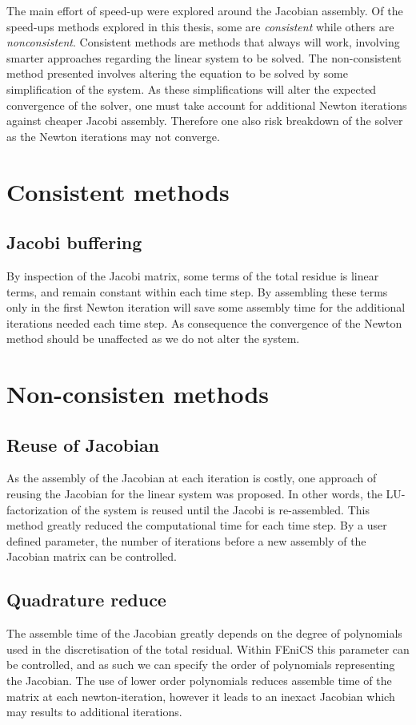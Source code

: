 The main effort of speed-up were explored around the Jacobian assembly.
Of the speed-ups methods explored in this thesis, some are \textit{consistent} while others are \textit{nonconsistent}. Consistent methods are methods that always will work, involving smarter approaches regarding the linear system to be solved. The non-consistent method presented involves altering the equation to be solved by some simplification of the system. As these simplifications will alter the expected convergence of the solver, one must take account for additional Newton iterations against cheaper Jacobi assembly. Therefore one also risk breakdown of the solver as the Newton iterations may not converge.   


\section{Consistent methods}
\subsection{Jacobi buffering}
By inspection of the Jacobi matrix, some terms of the total residue is linear terms, and remain constant within each time step. By assembling these terms only in the first Newton iteration will save some assembly time for the additional iterations needed each time step. As consequence the convergence of the Newton method should be unaffected as we do not alter the system.  

\section{Non-consisten methods}    
\subsection{Reuse of Jacobian}
As the assembly of the Jacobian at each iteration is costly, one approach of reusing the Jacobian for the linear system was proposed. In other words, the LU-factorization of the system is reused until the Jacobi is re-assembled. This method greatly reduced the computational time for each time step. By a user defined parameter, the number of iterations before a new assembly of the Jacobian matrix can be controlled. 

\subsection{Quadrature reduce}
The assemble time of the Jacobian greatly depends on the degree of polynomials used in the discretisation of the total residual. Within FEniCS this parameter can be controlled, and as such we can specify the order of polynomials representing the Jacobian. The use of lower order polynomials reduces assemble time of the matrix at each newton-iteration, however it leads to an inexact Jacobian which may results to additional iterations. 


